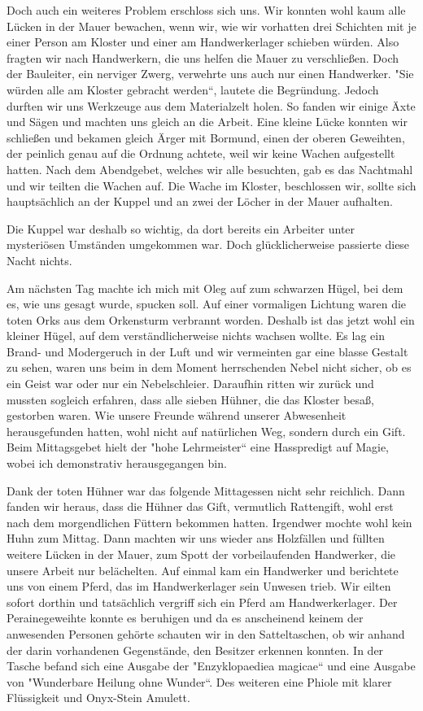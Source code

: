 \documentclass[11pt]{scrreprt}
\begin{document}
Doch auch ein weiteres Problem erschloss sich uns. Wir konnten wohl kaum alle Lücken in der Mauer bewachen, wenn wir, wie wir vorhatten drei Schichten mit je einer Person am Kloster und einer am Handwerkerlager schieben würden. Also fragten wir nach Handwerkern, die uns helfen die Mauer zu verschließen. Doch der Bauleiter, ein nerviger Zwerg, verwehrte uns auch nur einen Handwerker. "Sie würden alle am Kloster gebracht werden“, lautete die Begründung. Jedoch durften wir uns Werkzeuge aus dem Materialzelt holen. So fanden wir einige Äxte und Sägen und machten uns gleich an die Arbeit. Eine kleine Lücke konnten wir schließen und bekamen gleich Ärger mit Bormund, einen der oberen Geweihten, der peinlich genau auf die Ordnung achtete, weil wir keine Wachen aufgestellt hatten. Nach dem Abendgebet, welches wir alle besuchten, gab es das Nachtmahl und wir teilten die Wachen auf. Die Wache im Kloster, beschlossen wir, sollte sich hauptsächlich an der Kuppel und an zwei der Löcher in der Mauer aufhalten.\par
Die Kuppel war deshalb so wichtig, da dort bereits ein Arbeiter unter mysteriösen Umständen umgekommen war. Doch glücklicherweise passierte diese Nacht nichts.\par
Am nächsten Tag machte ich mich mit Oleg auf zum schwarzen Hügel, bei dem es, wie uns gesagt wurde, spucken soll. Auf einer vormaligen Lichtung waren die toten Orks aus dem Orkensturm verbrannt worden. Deshalb ist das jetzt wohl ein kleiner Hügel, auf dem verständlicherweise nichts wachsen wollte. Es lag ein Brand- und Modergeruch in der Luft und wir vermeinten gar eine blasse Gestalt zu sehen, waren uns beim in dem Moment herrschenden Nebel nicht sicher, ob es ein Geist war oder nur ein Nebelschleier. Daraufhin ritten wir zurück und mussten sogleich erfahren, dass alle sieben Hühner, die das Kloster besaß, gestorben waren. Wie unsere Freunde während unserer Abwesenheit herausgefunden hatten, wohl nicht auf natürlichen Weg, sondern durch ein Gift. Beim Mittagsgebet hielt der "hohe Lehrmeister“ eine Hasspredigt auf Magie, wobei ich demonstrativ herausgegangen bin.\par

Dank der toten Hühner war das folgende Mittagessen nicht sehr reichlich. Dann fanden wir heraus, dass die Hühner das Gift, vermutlich Rattengift, wohl erst nach dem morgendlichen Füttern bekommen hatten. Irgendwer mochte wohl kein Huhn zum Mittag. Dann machten wir uns wieder ans Holzfällen und füllten weitere Lücken in der Mauer, zum Spott der vorbeilaufenden Handwerker, die unsere Arbeit nur belächelten. Auf einmal kam ein Handwerker und berichtete uns von einem Pferd, das im Handwerkerlager sein Unwesen trieb. Wir eilten sofort dorthin und tatsächlich vergriff sich ein Pferd am Handwerkerlager. Der Perainegeweihte konnte es beruhigen und da es anscheinend keinem der anwesenden Personen gehörte schauten wir in den Satteltaschen, ob wir anhand der darin vorhandenen Gegenstände, den Besitzer erkennen konnten. In der Tasche befand sich eine Ausgabe der "Enzyklopaediea magicae“ und eine Ausgabe von "Wunderbare Heilung ohne Wunder“. Des weiteren eine Phiole mit klarer Flüssigkeit und Onyx-Stein Amulett. \par
\end{document}
